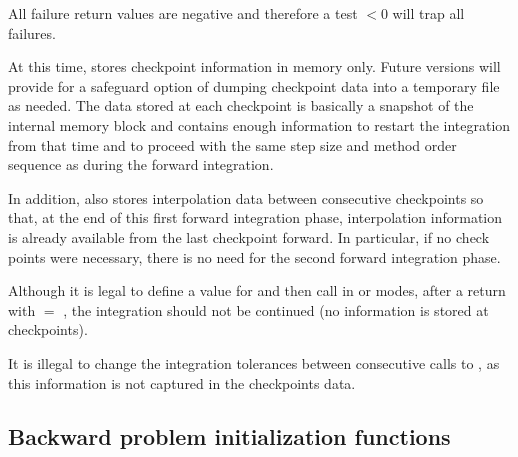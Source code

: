 {
  All failure return values are negative and therefore a test $< 0$
  will trap all  failures.

  At this time,  stores checkpoint information in memory
  only. Future versions will provide for a safeguard option of dumping checkpoint
  data into a temporary file as needed. The data stored at each checkpoint is basically
  a snapshot of the {\cvodes} internal memory block and contains enough information
  to restart the integration from that time and to proceed with the same step size and
  method order sequence as during the forward integration.
  
  In addition,  also stores interpolation data between consecutive checkpoints
  so that, at the end of this first forward integration phase, interpolation information
  is already available from the last checkpoint forward. In particular,
  if no check points were necessary, there is no need for the second forward integration phase.

  {\warn}Although it is legal to define a value for  and then call 
  in  or  modes, 
  after a return with  $=$ , the integration should not be 
  continued (no  information is stored at checkpoints).

  {\warn}It is illegal to change the integration tolerances between consecutive calls
  to , as this information is not captured in the checkpoints data.
}  

\subsection{Backward problem initialization functions}
\label{sss:cvodemallocb}

